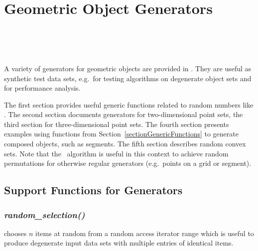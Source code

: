 
\ccParDims

\chapter{Geometric Object Generators}
\label{chapterGenerators}
\\
\\
\\

A variety of generators for geometric objects are provided in \cgal.
They are useful as synthetic test data sets, e.g.~for testing
algorithms on degenerate object sets and for performance analysis.

The first section provides useful generic functions related to random
numbers like . The second section
documents generators for two-dimensional point sets, the third section
for three-dimensional point sets. The fourth section presents examples
using functions from Section~\ref{sectionGenericFunctions} to generate
composed objects, such as segments.  The fifth section describes
random convex sets.  Note that the \stl\ algorithm
 is useful in this context to achieve random
permutations for otherwise regular generators (e.g.~points on a grid
or segment).

\section{Support Functions for Generators}


\subsection{{\it random\_selection()}}
\label{sectionRandomSelection}

 chooses $n$ items at random from a random
access iterator range which is useful to produce degenerate input data
sets with multiple entries of identical items.

